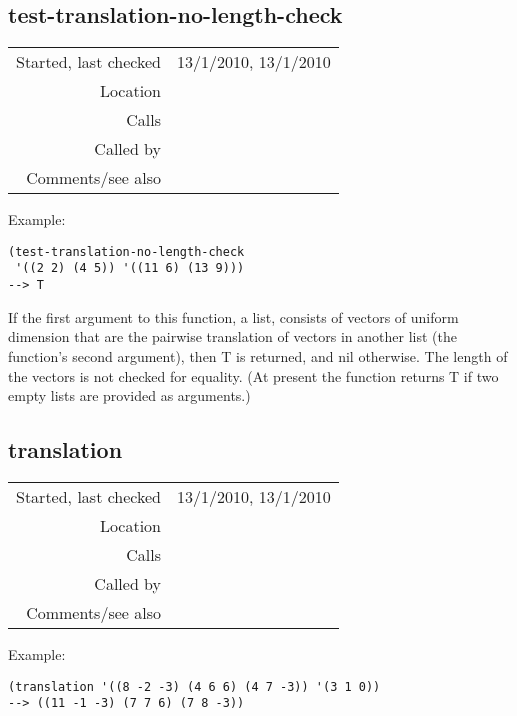 \subsection*{test-translation-no-length-check}\label{fun:test-translation-no-length-check}

\vspace{0.3cm}
\begin{tabular}{r|p{8cm}}
Started, last checked & 13/1/2010, 13/1/2010 \\
Location & \nameref{sec:set-operations} \\
Calls & \nameref{fun:subtract-two-lists} \\
Called by & \nameref{fun:test-translation} \\
Comments/see also & \nameref{fun:test-translation-mod-2nd-n-no-length-check}
\end{tabular}

\vspace{0.5cm}
\noindent Example:
\begin{verbatim}
(test-translation-no-length-check
 '((2 2) (4 5)) '((11 6) (13 9)))
--> T
\end{verbatim}

\noindent If the first argument to this function, a
list, consists of vectors of uniform dimension that
are the pairwise translation of vectors in another
list (the function's second argument), then T is
returned, and nil otherwise. The length of the vectors
is not checked for equality. (At present the function
returns T if two empty lists are provided as
arguments.)


\subsection*{translation}\label{fun:translation}

\vspace{0.3cm}
\begin{tabular}{r|p{8cm}}
Started, last checked & 13/1/2010, 13/1/2010 \\
Location & \nameref{sec:set-operations} \\
Calls & \nameref{fun:add-two-lists} \\
Called by & \nameref{fun:translational-equivalence-class} \\
Comments/see also & \nameref{fun:translation-mod-2nd-n}
\end{tabular}

\vspace{0.5cm}
\noindent Example:
\begin{verbatim}
(translation '((8 -2 -3) (4 6 6) (4 7 -3)) '(3 1 0))
--> ((11 -1 -3) (7 7 6) (7 8 -3))
\end{verbatim}

